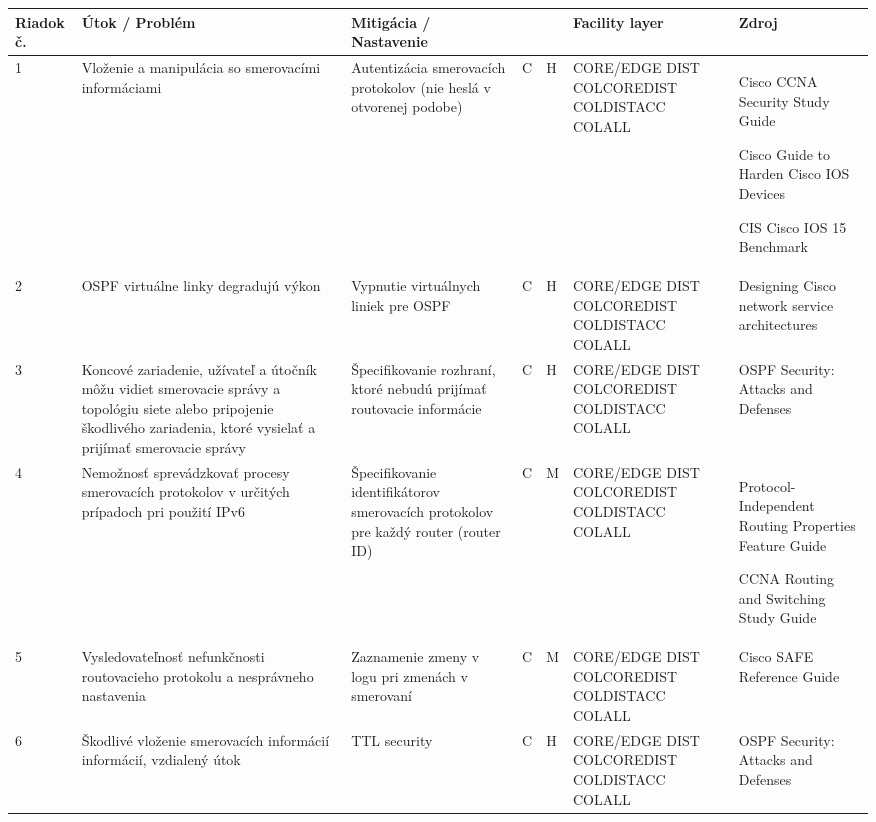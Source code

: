 \begin{longtable}[!htbp]{|C{2.5em}L{9em}L{9em}C{2em}C{2.5em}C{7.5em}L{10em}|}
	
	\hline
	\centering
	
	Riadok č.	&Útok / Problém	&Mitigácia / Nastavenie	& 	&	&Facility layer	&Zdroj\\
	\endhead
	
	 1	&Vloženie a manipulácia so smerovacími informáciami	&Autentizácia smerovacích protokolov (nie heslá v otvorenej podobe)	&C	&H	&CORE/EDGE
	DIST
	COLCOREDIST
	COLDISTACC
	COLALL	&Cisco CCNA Security Study Guide \cite{McMillan2018}
	
	Cisco Guide to Harden Cisco IOS Devices \cite{Singh2018}
	
	CIS Cisco IOS 15 Benchmark \cite{CIS_DrTLsgXv24lxeIIM}\\
	2	&OSPF virtuálne linky degradujú výkon	&Vypnutie virtuálnych liniek pre OSPF	&C	&H	&CORE/EDGE
	DIST
	COLCOREDIST
	COLDISTACC
	COLALL	&Designing Cisco network service architectures \cite{Tiso2012}\\
	 3	&Koncové zariadenie, užívateľ a útočník môžu vidiet smerovacie správy a topológiu siete alebo pripojenie škodlivého zariadenia, ktoré vysielať a prijímať smerovacie správy	&Špecifikovanie rozhraní, ktoré nebudú prijímať routovacie informácie	&C	&H	&CORE/EDGE
	DIST
	COLCOREDIST
	COLDISTACC
	COLALL	&OSPF Security: Attacks and Defenses \cite{Khandelwal2016}\\
	4	&Nemožnosť sprevádzkovať procesy smerovacích protokolov v určitých prípadoch pri použití IPv6	&Špecifikovanie identifikátorov smerovacích protokolov pre každý router (router ID)	&C	&M	&CORE/EDGE
	DIST
	COLCOREDIST
	COLDISTACC
	COLALL	&Protocol-Independent Routing Properties Feature Guide \cite{q7WZuvqA1fZEsYyL}
	
	CCNA Routing and Switching Study Guide \cite{Lammle2013}\\
	 5	&Vysledovateľnosť nefunkčnosti routovacieho protokolu a nesprávneho nastavenia	&Zaznamenie zmeny v logu pri zmenách v smerovaní	&C	&M	&CORE/EDGE
	DIST
	COLCOREDIST
	COLDISTACC
	COLALL	&Cisco SAFE Reference Guide \cite{uYLsMtQInofenpV3}
	\\
	6	& Škodlivé vloženie smerovacích informácií informácií, vzdialený útok	&TTL security	&C	&H	&CORE/EDGE
	DIST
	COLCOREDIST
	COLDISTACC
	COLALL	&OSPF Security: Attacks and Defenses \cite{Khandelwal2016}
	

\end{longtable}
